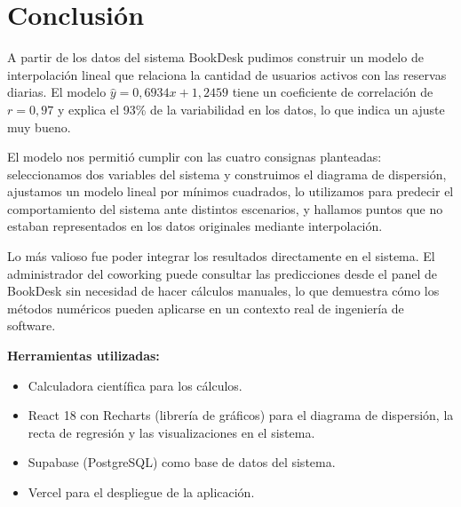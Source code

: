 \documentclass[12pt,a4paper]{article}
\begin{document}
\section*{Conclusión}

A partir de los datos del sistema BookDesk pudimos construir un modelo de interpolación lineal que relaciona la cantidad de usuarios activos con las reservas diarias. El modelo $\hat{y} = 0{,}6934x + 1{,}2459$ tiene un coeficiente de correlación de $r = 0{,}97$ y explica el 93\% de la variabilidad en los datos, lo que indica un ajuste muy bueno.

El modelo nos permitió cumplir con las cuatro consignas planteadas: seleccionamos dos variables del sistema y construimos el diagrama de dispersión, ajustamos un modelo lineal por mínimos cuadrados, lo utilizamos para predecir el comportamiento del sistema ante distintos escenarios, y hallamos puntos que no estaban representados en los datos originales mediante interpolación.

Lo más valioso fue poder integrar los resultados directamente en el sistema. El administrador del coworking puede consultar las predicciones desde el panel de BookDesk sin necesidad de hacer cálculos manuales, lo que demuestra cómo los métodos numéricos pueden aplicarse en un contexto real de ingeniería de software.

\vspace{1cm}
\noindent\textbf{Herramientas utilizadas:}
\begin{itemize}[itemsep=4pt]
  \item Calculadora científica para los cálculos.
  \item React 18 con Recharts (librería de gráficos) para el diagrama de dispersión, la recta de regresión y las visualizaciones en el sistema.
  \item Supabase (PostgreSQL) como base de datos del sistema.
  \item Vercel para el despliegue de la aplicación.
\end{itemize}
\end{document}

